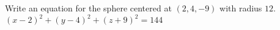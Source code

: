 {Write an equation for the sphere centered at $(2,4,-9)$ with radius $12$.
}
{$(x-2)^2+(y-4)^2+(z+9)^2=144$
}

